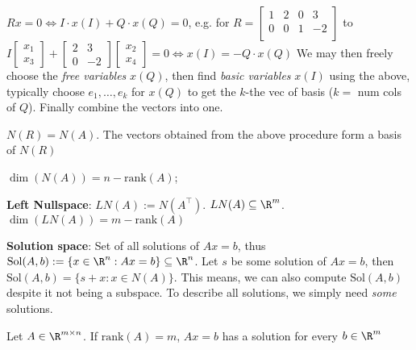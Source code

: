 $Rx = 0 \Leftrightarrow I \cdot x(I) + Q \cdot x(Q) = 0$, e.g. for $R = \begin{bmatrix}
    1 & 2 & 0 & 3\\
    0 & 0 & 1 & -2\\
\end{bmatrix}$ to $I \begin{bmatrix}
    x_1\\ x_3
\end{bmatrix} + \begin{bmatrix}
    2 & 3\\
    0 & -2
\end{bmatrix}
\begin{bmatrix}
    x_2\\x_4
\end{bmatrix} = 0 \Leftrightarrow x(I) = -Q\cdot x(Q)$
We may then freely choose the \textit{free variables} $x(Q)$, then find \textit{basic variables} $x(I)$ using the above, typically choose $e_1, \ldots, e_k$ for $x(Q)$ to get the $k$-the vec of basis ($k =$ num cols of $Q$). 
Finally combine the vectors into one.

\shortlemma $N(R) = N(A)$. The vectors obtained from the above procedure form a basis of $N(R)$

\vspace{-0.3pc}
\shorttheorem $\dim(N(A)) = n - \text{rank}(A)$;


\shortdef \textbf{Left Nullspace}: $LN(A) := N(A^{\top}).$ \shortlemma $LN(A)\subseteq \R^m$. \shorttheorem $\dim(LN(A)) = m - \text{rank}(A)$

\shortdef \textbf{Solution space}: Set of all solutions of $Ax = b$, thus $\text{Sol}(A, b) := \{x \in \R^n : Ax = b\} \subseteq \R^n$. \shorttheorem Let $s$ be some solution of $Ax = b$, then $\text{Sol}(A, b) = \{s + x : x \in N(A)\}$. This means, we can also compute $\text{Sol}(A, b)$ despite it not being a subspace. To describe all solutions, we simply need \textit{some} solutions.

\shortlemma Let $A \in \R^{m \times n}$. If $\text{rank}(A) = m$, $Ax = b$ has a solution for every $b \in \R^m$
